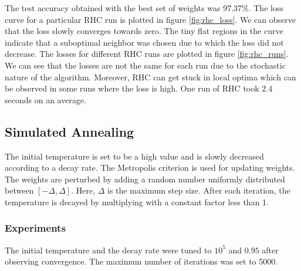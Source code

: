 \documentclass[letterpaper]{article}
\begin{document}
	The test accuracy obtained with the best set of weights was 97.37\%. The loss curve for a particular RHC run is plotted in figure \ref{fig:rhc_loss}. We can observe that the loss slowly converges towards zero. The tiny flat regions in the curve indicate that a suboptimal neighbor was chosen due to which the loss did not decrease. The losses for different RHC runs are plotted in figure \ref{fig:rhc_runs}. We can see that the losses are not the same for each run due to the stochastic nature of the algorithm. Moreover, RHC can get stuck in local optima which can be observed in some runs where the loss is high. One run of RHC took 2.4 seconds on an average.
	
	\subsection{Simulated Annealing}
	The initial temperature is set to be a high value and is slowly decreased according to a decay rate. The Metropolis criterion\cite{vanlaarhovenSimulatedAnnealing1987} is used for updating weights. The weights are perturbed by adding a random number uniformly distributed between $[-\Delta, \Delta]$. Here, $\Delta$ is the maximum step size. After each iteration, the temperature is decayed by multiplying with a constant factor less than 1.
	
	\subsubsection{Experiments}
	The initial temperature and the decay rate were tuned to $10^{5}$ and $0.95$ after observing convergence. The maximum number of iterations was set to 5000.
	
\end{document}
